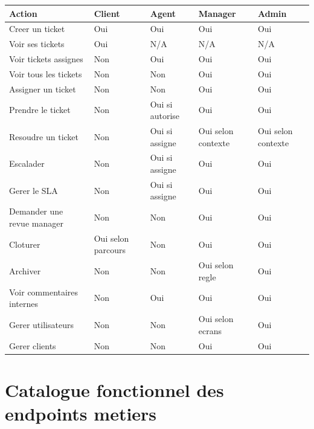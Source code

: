 \begingroup
\footnotesize
\setlength{\tabcolsep}{4pt}
\begin{longtable}{>{\raggedright\arraybackslash}p{4.6cm} >{\centering\arraybackslash}p{1.8cm} >{\centering\arraybackslash}p{2cm} >{\centering\arraybackslash}p{2cm} >{\centering\arraybackslash}p{2cm}}
\toprule
Action & Client & Agent & Manager & Admin \\
\midrule
Creer un ticket & Oui & Oui & Oui & Oui \\
Voir ses tickets & Oui & N/A & N/A & N/A \\
Voir tickets assignes & Non & Oui & Oui & Oui \\
Voir tous les tickets & Non & Non & Oui & Oui \\
Assigner un ticket & Non & Non & Oui & Oui \\
Prendre le ticket & Non & Oui si autorise & Oui & Oui \\
Resoudre un ticket & Non & Oui si assigne & Oui selon contexte & Oui selon contexte \\
Escalader & Non & Oui si assigne & Oui & Oui \\
Gerer le SLA & Non & Oui si assigne & Oui & Oui \\
Demander une revue manager & Non & Non & Oui & Oui \\
Cloturer & Oui selon parcours & Non & Oui & Oui \\
Archiver & Non & Non & Oui selon regle & Oui \\
Voir commentaires internes & Non & Oui & Oui & Oui \\
Gerer utilisateurs & Non & Non & Oui selon ecrans & Oui \\
Gerer clients & Non & Non & Oui & Oui \\
\bottomrule
\end{longtable}
\endgroup

\chapter{Catalogue fonctionnel des endpoints metiers}

